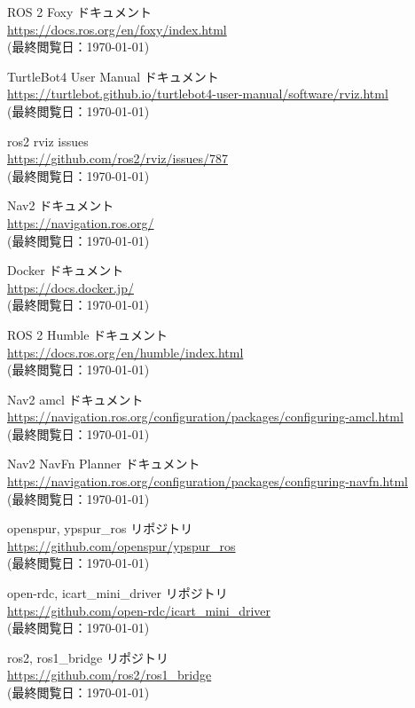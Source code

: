 \documentclass[twocolumn, 9pt]{jsproceedings}
\begin{document}
\begin{thebibliography}{99}
ROS 2 Foxy ドキュメント\\
\url{https://docs.ros.org/en/foxy/index.html}\\
(最終閲覧日：\today)

TurtleBot4 User Manual ドキュメント\\
\url{https://turtlebot.github.io/turtlebot4-user-manual/software/rviz.html}\\
(最終閲覧日：\today)

ros2 rviz issues\\
\url{https://github.com/ros2/rviz/issues/787}\\
(最終閲覧日：\today)

Nav2 ドキュメント\\
\url{https://navigation.ros.org/}\\
(最終閲覧日：\today)

Docker ドキュメント\\
\url{https://docs.docker.jp/}\\
(最終閲覧日：\today)

ROS 2 Humble ドキュメント\\
\url{https://docs.ros.org/en/humble/index.html}\\
(最終閲覧日：\today)

Nav2 amcl ドキュメント\\
\url{https://navigation.ros.org/configuration/packages/configuring-amcl.html}\\
(最終閲覧日：\today)

Nav2 NavFn Planner ドキュメント\\
\url{https://navigation.ros.org/configuration/packages/configuring-navfn.html}\\
(最終閲覧日：\today)

openspur, ypspur\_ros リポジトリ\\
\url{https://github.com/openspur/ypspur_ros}\\
(最終閲覧日：\today)

open-rdc, icart\_mini\_driver リポジトリ\\
\url{https://github.com/open-rdc/icart_mini_driver}\\
(最終閲覧日：\today)

ros2, ros1\_bridge リポジトリ\\
\url{https://github.com/ros2/ros1_bridge}\\
(最終閲覧日：\today)





\end{thebibliography}
\normalsize
\end{document}
